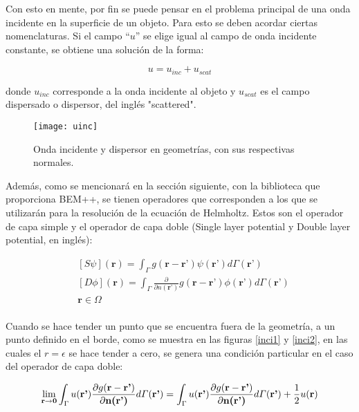 \documentclass[12pt,letterpaper]{article}
\numberwithin{equation}{section}
\begin{document}
Con esto en mente, por fin se puede pensar en el problema principal de una onda incidente en la superficie de un objeto. Para esto se deben acordar ciertas nomenclaturas. Si el campo ``$u$'' se elige igual al campo de onda incidente constante, se obtiene una solución de la forma:

\begin{equation}
	u = u_{inc} + u_{scat}
	\label{u}
\end{equation} 

\noindent donde $u_{inc}$ corresponde a la onda incidente al objeto y $u_{scat}$ es el campo dispersado o dispersor, del inglés "scattered".

\begin{figure}[H]
	\centering
	\texttt{[image: uinc]}
	\caption{Onda incidente y dispersor en geometrías, con sus respectivas normales. \cite{Multitrace_acoustic} }
\end{figure}

Además, como se mencionará en la sección siguiente, con la biblioteca que proporciona BEM++, se tienen operadores que corresponden a los que se utilizarán para la resolución de la ecuación de Helmholtz. Estos son el operador de capa simple y el operador de capa doble (Single layer potential y Double layer potential, en inglés):


\begin{equation}
\begin{split}
&[S\psi](\textbf{r})=\int_{\Gamma}g(\textbf{r}-\textbf{r'})\psi(\textbf{r'}) d\varGamma(\textbf{r'})\\
&[D\phi](\textbf{r})=\int_{\Gamma}\frac{\partial}{\partial n(\textbf{r'})} g(\textbf{r}-\textbf{r'})\phi(\textbf{r'}) d\varGamma(\textbf{r'})\\  
&\textbf{r}\in\Omega\\
\end{split}
\label{ecuacionoperadores}
\end{equation}

Cuando se hace tender un punto que se encuentra fuera de la geometría, a un punto definido en el borde, como se muestra en las figuras \ref{inci1} y \ref{inci2}, en las cuales el $r=\epsilon$ se hace tender a cero, se genera una condición particular en el caso del operador de capa doble:

$$\lim\limits_{\textbf{r}\rightarrow \textbf{0}}\int_{\Gamma}u(\textbf{r'})\frac{\partial g(\textbf{r}-\textbf{r'})}{\partial\textbf{n(\textbf{r'})}}d\varGamma(\textbf{r'})=\int_{\Gamma}u(\textbf{r'})\frac{\partial g(\textbf{r}-\textbf{r'})}{\partial\textbf{n(\textbf{r'})}}d\varGamma(\textbf{r'}) + \frac{1}{2}u(\textbf{r})$$
\end{document}
